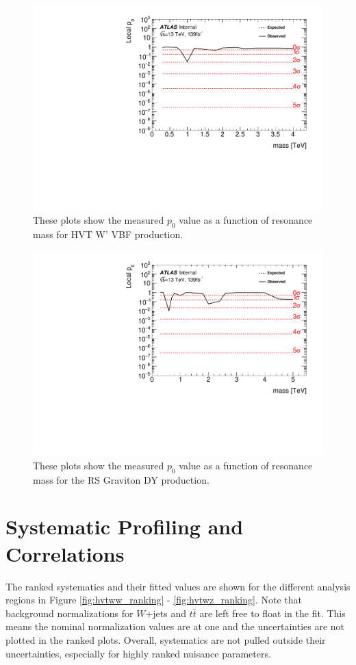 \begin{figure}[h!]
  \centering
  \includegraphics[width=\hsize]{figures/results/pvalues/fixed_pvalues/hvtwzvbf_pvalue.pdf}
 \caption{These plots show the measured $p_{0}$ value as a function of resonance mass for HVT W' VBF production.} 
  \label{fig:discov_hvtwzvbf}
\end{figure} 
\FloatBarrier


\begin{figure}[h!]
  \centering
  \includegraphics[width=\hsize]{figures/results/pvalues/fixed_pvalues/rsg_pvalue.pdf}
 \caption{These plots show the measured $p_{0}$ value as a function of resonance mass for the RS Graviton DY production.} 
  \label{fig:discov_rsg}
\end{figure} 
\FloatBarrier
\section{Systematic Profiling and Correlations}
The ranked systematics and their fitted values are shown for the different analysis regions in Figure \ref{fig:hvtww_ranking} - \ref{fig:hvtwz_ranking}. Note that background normalizations for $W$+jets and $t\bar{t}$ are left free to float in the fit. This means the nominal normalization values are at one and the uncertainties are not plotted in the ranked plots. Overall, systematics are not pulled outside their uncertainties, especially for highly ranked nuisance parameters. 

